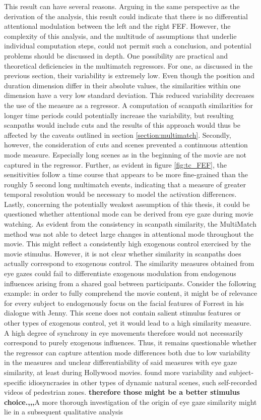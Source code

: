 \documentclass[a4paper, 12pt]{scrreprt}
\begin{document}
This result can have several reasons. Arguing in the same perspective as the derivation of the analysis, this result could indicate that there is no differential attentional modulation between the left and the right FEF. However, the complexity of this analysis, and the multitude of assumptions that underlie individual computation steps, could not permit such a conclusion, and potential problems should be discussed in depth. One possibility are practical and theoretical deficiencies in the multimatch regressors. For one, as discussed in the previous section, their variability is extremely low. Even though the position and duration dimension differ in their absolute values, the similarities within one dimension have a very low standard deviation. This reduced variability decreases the use of the measure as a regressor. A computation of scanpath similarities for longer time periods could potentially increase the variability, but resulting scanpaths would include cuts and the results of this approach would thus be affected by the caveats outlined in section \ref{section:multimatch}. Secondly, however, the consideration of cuts and scenes prevented a continuous attention mode measure. Especially long scenes as in the beginning of the movie are not captured in the regressor. Further, as evident in figure \ref{fig:tc_FEF}, the sensitivities follow a time course that appears to be more fine-grained than the roughly 5 second long multimatch events, indicating that a measure of greater temporal resolution would be necessary to model the activation differences. Lastly, concerning the potentially weakest assumption of this thesis, it could be questioned whether attentional mode can be derived from eye gaze during movie watching. As evident from the consistency in scanpath similarity, the MultiMatch method was not able to detect large changes in attentional mode throughout the movie. This might reflect a consistently high exogenous control exercised by the movie stimulus. However, it is not clear whether similarity in scanpaths does actually correspond to exogenous control. The similarity measures obtained from eye gazes could fail to differentiate exogenous modulation from endogenous influences arising from a shared goal between participants. Consider the following example: in order to fully comprehend the movie content, it might be of relevance for every subject to endogenously focus on the facial features of Forrest in his dialogue with Jenny. This scene does not contain salient stimulus features or other types of exogenous control, yet it would lead to a high similarity measure. A high degree of synchrony in eye movements therefore would not necessarily correspond to purely exogenous influences. Thus, it remains questionable whether the regressor can capture attention mode differences both due to low variability in the measures and unclear differentiability of said measures with eye gaze similarity, at least during Hollywood movies. \textcite{dorr2010variability} found more variability and subject-specific idiosyncrasies in other types of dynamic natural scenes, such self-recorded videos of pedestrian zones. \textbf{therefore those might be a better stimulus choice.,,,}A more thorough investigation of the origin of eye gaze similarity might lie in a subsequent qualitative analysis 
\end{document}
